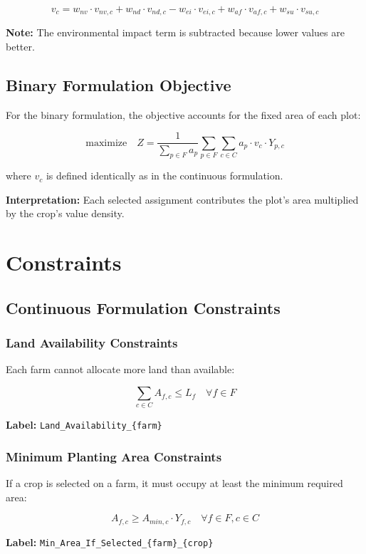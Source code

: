 \documentclass{article}
\begin{document}
$$v_c = w_{nv} \cdot v_{nv,c} + w_{nd} \cdot v_{nd,c} - w_{ei} \cdot v_{ei,c} + w_{af} \cdot v_{af,c} + w_{su} \cdot v_{su,c}$$

\textbf{Note:} The environmental impact term is subtracted because lower values are better.

\subsection{Binary Formulation Objective}

For the binary formulation, the objective accounts for the fixed area of each plot:

$$\text{maximize} \quad Z = \frac{1}{\sum_{p \in F} a_p} \sum_{p \in F} \sum_{c \in C} a_p \cdot v_c \cdot Y_{p,c}$$

where $v_c$ is defined identically as in the continuous formulation.

\textbf{Interpretation:} Each selected assignment contributes the plot's area multiplied by the crop's value density.

\section{Constraints}

\subsection{Continuous Formulation Constraints}

\subsubsection{Land Availability Constraints}

Each farm cannot allocate more land than available:

$$\sum_{c \in C} A_{f,c} \leq L_f \quad \forall f \in F$$

\textbf{Label:} \texttt{Land\_Availability\_\{farm\}}

\subsubsection{Minimum Planting Area Constraints}

If a crop is selected on a farm, it must occupy at least the minimum required area:

$$A_{f,c} \geq A_{min,c} \cdot Y_{f,c} \quad \forall f \in F, c \in C$$

\textbf{Label:} \texttt{Min\_Area\_If\_Selected\_\{farm\}\_\{crop\}}
\end{document}
